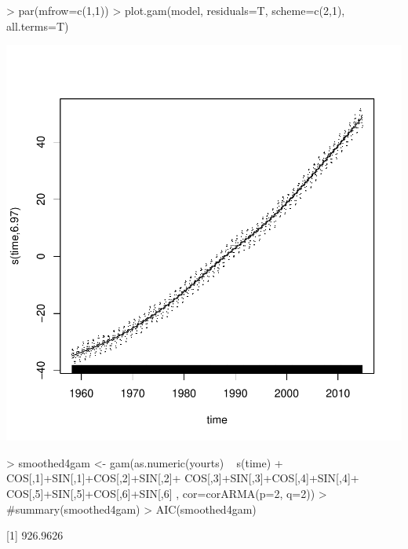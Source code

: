 \documentclass[11pt, a4paper]{article} %
\begin{document}
\begin{Schunk}
\begin{Sinput}
> par(mfrow=c(1,1))
> plot.gam(model, residuals=T, scheme=c(2,1), all.terms=T)
\end{Sinput}
\end{Schunk}
\includegraphics{alleselena-077}

\begin{Schunk}
\begin{Sinput}
> smoothed4gam <- gam(as.numeric(yourts) ~ s(time)  +
                         COS[,1]+SIN[,1]+COS[,2]+SIN[,2]+
                         COS[,3]+SIN[,3]+COS[,4]+SIN[,4]+
                         COS[,5]+SIN[,5]+COS[,6]+SIN[,6]
                       , cor=corARMA(p=2, q=2))
> #summary(smoothed4gam)
> AIC(smoothed4gam)
\end{Sinput}
[1] 926.9626\end{Schunk}
\end{document}
